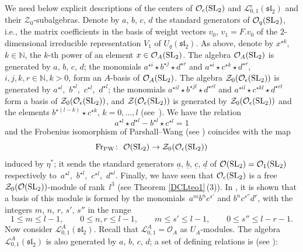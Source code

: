 \documentclass[pdftex]{sigma}
\numberwithin{equation}{section}
\theoremstyle{definition}
\newcommand{\e}{\epsilon}
\newcommand{\mn}{\mathbb{N}}
\newcommand{\Ll}{{\mathcal L}}
\newcommand{\Oo}{{\mathcal O}}
\newcommand{\ra}{\rightarrow}
\begin{document}
We need below explicit descriptions of the centers of $\Oo_\e({\rm SL}_2)$ and $\Ll_{0,1}^\e({\mathfrak{sl}_2})$ and their $\mathcal{Z}_0$-subalgebras. Denote by $a$, $b$, $c$, $d$ the standard generators of $\mathcal{O}_q({\rm SL}_2)$, i.e., the matrix coefficients in the basis of weight vectors $v_0$, $v_1=F.v_0$ of the $2$-dimensional irreducible representation $V_1$ of $U_q({\mathfrak{sl}_2})$. As above, denote by $x^{\star k}$, $k\in \mathbb{N}$, the $k$-th power of an element $x\in \Oo_A({\rm SL}_2)$. The algebra $\mathcal{O}_A({\rm SL}_2)$ is generated by $a$, $b$, $c$, $d$; the monomials $a^{\star i } \star b^{\star j } \star d^{\star r }$ and $a^{\star i } \star c^{\star k } \star d^{\star r }$, $i,j,k,r\in \mn, k>0$, form an $A$-basis of $\mathcal{O}_A({\rm SL}_2)$. The algebra $\mathcal{Z}_0(\Oo_\e({\rm SL}_2))$ is generated by $a^{\star l}$,~$b^{\star l}$,~$c^{\star l}$,~$d^{\star l}$; the monomials $a^{\star i l} \star b^{\star j l} \star d^{\star r l}$ and $a^{\star i l} \star c^{\star k l} \star d^{\star r l}$ form a basis of $\mathcal{Z}_0(\Oo_\e({\rm SL}_2))$, and $\mathcal{Z}(\Oo_\e({\rm SL}_2))$ is generated by $\mathcal{Z}_0(\Oo_\e({\rm SL}_2))$ and the elements $b^{\star (l-k)}\star c^{\star k}$, $k=0,\dots,l$ (see~\cite[Proposition~1.4 and the appendix]{DC-L}). We have the relation
\begin{equation}\label{PWrel} a^{\star l}\star d^{\star l}-b^{\star l}\star c^{\star l} =1
\end{equation}
and the Frobenius isomorphism of Parshall--Wang (see \cite[Chapter~7]{PW}) coincides with the map
\[{\rm Fr}_{\rm PW}\colon\ \Oo({\rm SL}_2) \ra \mathcal{Z}_0(\Oo_\e({\rm SL}_2))\]
induced by $\eta^*$; it sends the standard generators $\underline{a}$, $\underline{b}$, $\underline{c}$, $\underline{d}$ of $\Oo({\rm SL}_2) = \mathcal{O}_1({\rm SL}_2)$ respectively to~$a^{\star l}$,~$b^{\star l}$,~$c^{\star l}$,~$d^{\star l}$. Finally, we have seen that $\Oo_\e({\rm SL}_2)$ is a free $\mathcal{Z}_0(\Oo({\rm SL}_2))$-module of rank~$l^3$ (see Theorem \ref{DCLteo1}\,(3)). In \cite{DRZ}, it is shown that a basis of this module is formed by the monomials~$a^mb^nc^{s'}$ and $b^nc^{s''}d^r$, with the integers $m$, $n$, $r$, $s'$, $s''$ in the range
\begin{equation}\label{basisSL2}
1\leq m \leq l-1,\qquad 0 \leq n,r \leq l-1,\qquad m \leq s' \leq l-1,\qquad 0 \leq s'' \leq l-r-1.
\end{equation}
Now consider $\Ll_{0,1}^A({\mathfrak{sl}_2})$. Recall that $\Ll_{0,1}^A=\Oo_A$ as $U_A$-modules. The algebra $\Ll_{0,1}^A({\mathfrak{sl}_2})$ is also generated by $a$, $b$, $c$, $d$; a set of defining relations is (see \cite[Section 5]{BR}):
\end{document}
